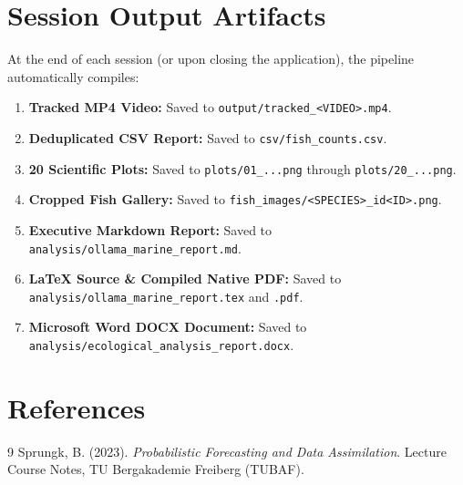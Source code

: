 \documentclass[11pt,a4paper]{article}
\begin{document}
\section{Session Output Artifacts}
At the end of each session (or upon closing the application), the pipeline automatically compiles:
\begin{enumerate}
    \item \textbf{Tracked MP4 Video:} Saved to \texttt{output/tracked\_<VIDEO>.mp4}.
    \item \textbf{Deduplicated CSV Report:} Saved to \texttt{csv/fish\_counts.csv}.
    \item \textbf{20 Scientific Plots:} Saved to \texttt{plots/01\_...png} through \texttt{plots/20\_...png}.
    \item \textbf{Cropped Fish Gallery:} Saved to \texttt{fish\_images/<SPECIES>\_id<ID>.png}.
    \item \textbf{Executive Markdown Report:} Saved to \texttt{analysis/ollama\_marine\_report.md}.
    \item \textbf{LaTeX Source \& Compiled Native PDF:} Saved to \texttt{analysis/ollama\_marine\_report.tex} and \texttt{.pdf}.
    \item \textbf{Microsoft Word DOCX Document:} Saved to \texttt{analysis/ecological\_analysis\_report.docx}.
\end{enumerate}

\section{References}
\begin{thebibliography}{9}
     Sprungk, B. (2023). \textit{Probabilistic Forecasting and Data Assimilation}. Lecture Course Notes, TU Bergakademie Freiberg (TUBAF).
\end{thebibliography}
\end{document}
